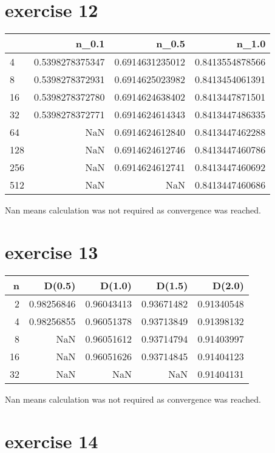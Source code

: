 \documentclass{article}
\begin{document}
\section{exercise 12}
\begin{tabular}{lrrr}
    \toprule
        & n\_0.1          & n\_0.5          & n\_1.0          \\
    \midrule
    4   & 0.5398278375347 & 0.6914631235012 & 0.8413554878566 \\
    8   & 0.5398278372931 & 0.6914625023982 & 0.8413454061391 \\
    16  & 0.5398278372780 & 0.6914624638402 & 0.8413447871501 \\
    32  & 0.5398278372771 & 0.6914624614343 & 0.8413447486335 \\
    64  & NaN             & 0.6914624612840 & 0.8413447462288 \\
    128 & NaN             & 0.6914624612746 & 0.8413447460786 \\
    256 & NaN             & 0.6914624612741 & 0.8413447460692 \\
    512 & NaN             & NaN             & 0.8413447460686 \\
    \bottomrule
\end{tabular}

Nan means calculation was not required as convergence was reached.

\section{exercise 13}

\begin{tabular}{rrrrr}
    \toprule
    n  & D(0.5)     & D(1.0)     & D(1.5)     & D(2.0)     \\
    \midrule
    2  & 0.98256846 & 0.96043413 & 0.93671482 & 0.91340548 \\
    4  & 0.98256855 & 0.96051378 & 0.93713849 & 0.91398132 \\
    8  & NaN        & 0.96051612 & 0.93714794 & 0.91403997 \\
    16 & NaN        & 0.96051626 & 0.93714845 & 0.91404123 \\
    32 & NaN        & NaN        & NaN        & 0.91404131 \\
    \bottomrule
\end{tabular}

Nan means calculation was not required as convergence was reached.
\section{exercise 14}
\end{document}
